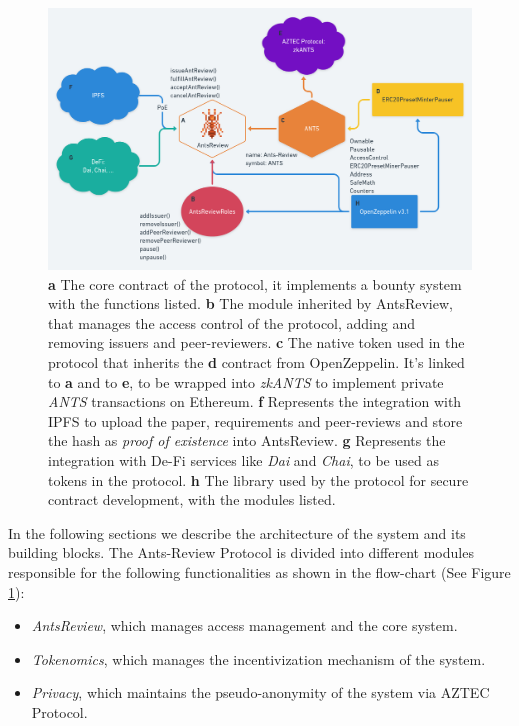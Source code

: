\documentclass[runningheads]{llncs}
\begin{document}
\begin{figure}
\centering
\includegraphics[scale=0.28]{AntsReview}
\caption{\textbf{a} The core contract of the protocol, it implements a bounty system with the functions listed.
\textbf{b} The module inherited by AntsReview, that manages the access control of the protocol, adding and removing issuers and peer-reviewers.
\textbf{c} The native token used in the protocol that inherits the \textbf{d} contract from OpenZeppelin. It's linked to \textbf{a} and to \textbf{e}, to be wrapped into \emph{zkANTS} to implement private \emph{ANTS} transactions on Ethereum.
\textbf{f} Represents the integration with IPFS to upload the paper, requirements and peer-reviews and store the hash as \emph{proof of existence} into AntsReview.
\textbf{g} Represents the integration with De-Fi services like \emph{Dai} and \emph{Chai}, to be used as tokens in the protocol.
\textbf{h} The library used by the protocol for secure contract development, with the modules listed.}
\label{fig:contracts}
\end{figure}

In the following sections we describe the architecture of the system and its building blocks.
\newline The Ants-Review Protocol is divided into different modules responsible for the following functionalities as shown in the flow-chart (See Figure \ref{fig:contracts}):

\begin{itemize}
\item \emph{AntsReview}, which manages access management and the core system.
\item \emph{Tokenomics}, which manages the incentivization mechanism of the system.
\item \emph{Privacy}, which maintains the pseudo-anonymity of the system via AZTEC Protocol.
\end{itemize}
\end{document}
